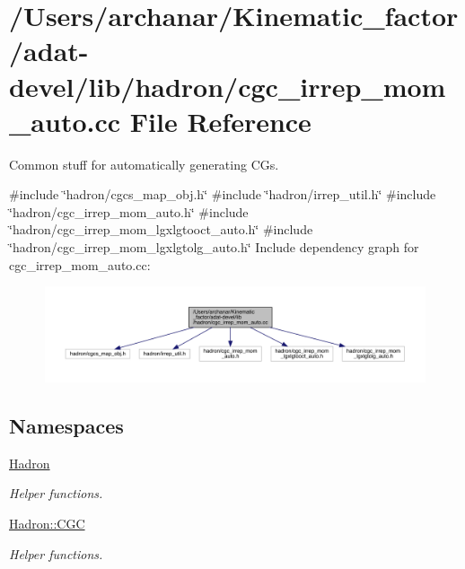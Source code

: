 \hypertarget{adat-devel_2lib_2hadron_2cgc__irrep__mom__auto_8cc}{}\section{/\+Users/archanar/\+Kinematic\+\_\+factor/adat-\/devel/lib/hadron/cgc\+\_\+irrep\+\_\+mom\+\_\+auto.cc File Reference}
\label{adat-devel_2lib_2hadron_2cgc__irrep__mom__auto_8cc}


Common stuff for automatically generating C\+Gs.  


{\ttfamily \#include \char`\"{}hadron/cgcs\+\_\+map\+\_\+obj.\+h\char`\"{}}\newline
{\ttfamily \#include \char`\"{}hadron/irrep\+\_\+util.\+h\char`\"{}}\newline
{\ttfamily \#include \char`\"{}hadron/cgc\+\_\+irrep\+\_\+mom\+\_\+auto.\+h\char`\"{}}\newline
{\ttfamily \#include \char`\"{}hadron/cgc\+\_\+irrep\+\_\+mom\+\_\+lgxlgtooct\+\_\+auto.\+h\char`\"{}}\newline
{\ttfamily \#include \char`\"{}hadron/cgc\+\_\+irrep\+\_\+mom\+\_\+lgxlgtolg\+\_\+auto.\+h\char`\"{}}\newline
Include dependency graph for cgc\+\_\+irrep\+\_\+mom\+\_\+auto.\+cc\+:
\nopagebreak
\begin{figure}[H]
\begin{center}
\leavevmode
\includegraphics[width=350pt]{d1/d51/adat-devel_2lib_2hadron_2cgc__irrep__mom__auto_8cc__incl}
\end{center}
\end{figure}
\subsection*{Namespaces}
\begin{DoxyCompactItemize}
\item 
 \mbox{\hyperlink{namespaceHadron}{Hadron}}
\begin{DoxyCompactList}\small\item\em Helper functions. \end{DoxyCompactList}\item 
 \mbox{\hyperlink{namespaceHadron_1_1CGC}{Hadron\+::\+C\+GC}}
\begin{DoxyCompactList}\small\item\em Helper functions. \end{DoxyCompactList}\end{DoxyCompactItemize}
